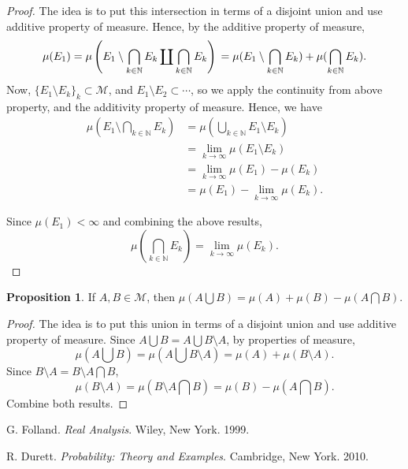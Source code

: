 \documentclass[12pt, reqno]{amsart}
\numberwithin{equation}{section}
\theoremstyle{definition}
\newtheorem*{proposition*}{Proposition}
\theoremstyle{definition}
\newcommand{\N}{\mathbb{N}}
\newcommand{\intersect}{\bigcap}
\newcommand{\union}{\bigcup}
\begin{document}
\begin{proof}

The idea is to put this intersection in terms of a disjoint union and use additive property of measure.
Hence, by the additive property of measure,
\[
\mu(E_1)
= \mu \left(E_1 \setminus \intersect_{k \in \N} E_k \coprod \intersect_{k \in \N} E_k \right) \\
= \mu(E_1 \setminus \intersect_{k \in \N} E_k) + \mu(\intersect_{k \in \N} E_k).
\]
Now, $\{ E_1 \setminus E_k\}_k \subset \mathcal{M}$, and $E_1 \setminus E_2 \subset \cdots$, so we apply the continuity from above property, and the additivity property of measure. Hence, we have
\begin{align*}
\mu(E_1 \setminus \intersect_{k \in \N} E_k)
&= \mu(\union_{k \in \N} E_1 \setminus E_k) \\
&= \lim_{k \to \infty} \mu(E_1 \setminus E_k) \\
&= \lim_{k \to \infty} \mu(E_1) - \mu(E_k) \\
&= \mu(E_1) - \lim_{k \to \infty}\mu(E_k).
\end{align*}

Since $\mu(E_1) < \infty$ and combining the above results,
\[
\mu(\intersect_{k \in \N} E_k) = \lim_{k \to \infty}\mu(E_k).
\]
\end{proof}

\begin{proposition*}
If $A, B \in \mathcal{M}$,
then $\mu(A \union B) = \mu(A) + \mu(B) - \mu(A \intersect B).$
\end{proposition*}

\begin{proof}
The idea is to put this union in terms of a disjoint union and use additive property of measure.
Since $A \union B = A \union B \setminus A$, by properties of measure,
$$
\mu(A \union B)
= \mu(A \union B \setminus A)
= \mu(A) + \mu(B \setminus A).
$$
Since $B \setminus A = B\setminus A \intersect B$,
$$
\mu(B \setminus A)
= \mu(B \setminus A \intersect B) 
= \mu(B) - \mu(A \intersect B).
$$
Combine both results.

\end{proof}

\begin{thebibliography}{1}
G. Folland. \textit{Real Analysis}. Wiley, New York. 1999.

R. Durett. \textit{Probability: Theory and Examples}. Cambridge, New York. 2010.
\end{thebibliography}
\end{document}

